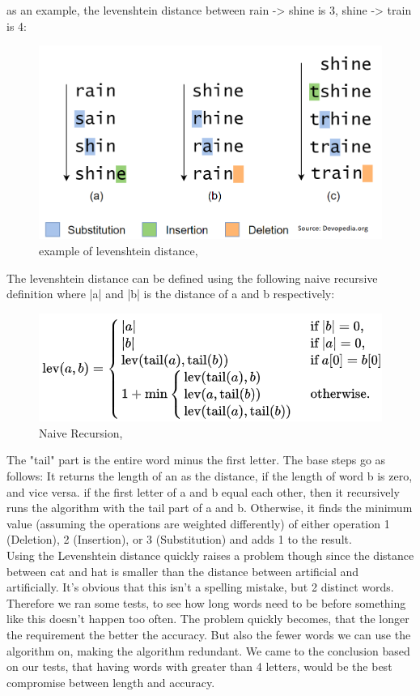 as an example, the levenshtein distance between rain -> shine is 3, shine -> train is 4:
\begin{figure}[H]
  \centering
  \includegraphics[scale = 0.6]{figures/levenshtein_example.png}
  \caption{example of levenshtein distance, \cite{levenshtein_distance}}
\end{figure}

The levenshtein distance can be defined using the following naive recursive definition where |a| and |b| is the distance of a and b respectively:
\begin{figure}[H]
  \centering
  \includegraphics[scale = 0.7]{figures/levenshtein_recursive.png}
  \caption{Naive Recursion, \cite{levenshtein_recursive_definition}}
\end{figure}
The "tail" part is the entire word minus the first letter.
The base steps go as follows: It returns the length of an as the distance, if the length of word b is zero, and vice versa.
if the first letter of a and b equal each other, then it recursively runs the algorithm with the tail part of a and b.
Otherwise, it finds the minimum value (assuming the operations are weighted differently) of either operation 1 (Deletion), 2 (Insertion), or 3 (Substitution) and adds 1 to the result. \\

Using the Levenshtein distance quickly raises a problem though since the distance between cat and hat is smaller than the distance
between artificial and artificially. 
It's obvious that this isn't a spelling mistake, but 2 distinct words. Therefore we ran
some tests, to see how long words need to be before something like this doesn't happen too often. 
The problem quickly becomes, that the longer the requirement the better the accuracy. 
But also the fewer words we can use the algorithm on, making the algorithm redundant.
We came to the conclusion based on our tests, that having words with greater than 4 letters, would be
the best compromise between length and accuracy. \\

